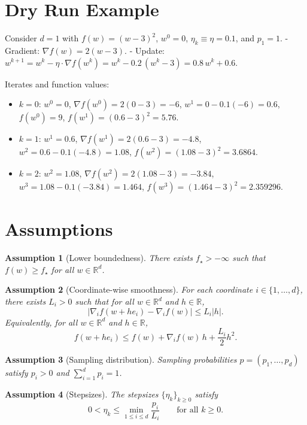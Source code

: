 \documentclass[11pt]{article}
\newtheorem{assumption}{Assumption}
\newcommand{\R}{\mathbb{R}}
\newcommand{\1}{\mathbbm{1}}
\begin{document}
\section*{Dry Run Example}
Consider $d=1$ with $f(w)=(w-3)^2$, $w^0=0$, $\eta_k\equiv \eta=0.1$, and $p_1=1$.
- Gradient: $\nabla f(w)=2(w-3)$.
- Update: $w^{k+1}=w^k-\eta\cdot \nabla f(w^k)=w^k-0.2\,(w^k-3)=0.8\,w^k+0.6$.

Iterates and function values:
\begin{itemize}
\item $k=0$: $w^0=0$, $\nabla f(w^0)=2(0-3)=-6$, $w^1=0-0.1(-6)=0.6$, $f(w^0)=9$, $f(w^1)=(0.6-3)^2=5.76$.
\item $k=1$: $w^1=0.6$, $\nabla f(w^1)=2(0.6-3)=-4.8$, $w^2=0.6-0.1(-4.8)=1.08$, $f(w^2)=(1.08-3)^2=3.6864$.
\item $k=2$: $w^2=1.08$, $\nabla f(w^2)=2(1.08-3)=-3.84$, $w^3=1.08-0.1(-3.84)=1.464$, $f(w^3)=(1.464-3)^2=2.359296$.
\end{itemize}

\section*{Assumptions}
\begin{assumption}[Lower boundedness]
There exists $f_\star>-\infty$ such that $f(w)\ge f_\star$ for all $w\in\R^d$.
\end{assumption}

\begin{assumption}[Coordinate-wise smoothness]
For each coordinate $i\in\{1,\dots,d\}$, there exists $L_i>0$ such that for all $w\in\R^d$ and $h\in\R$,
\[
\left|\nabla_i f\!\left(w+h e_i\right)-\nabla_i f(w)\right| \le L_i |h|.
\]
Equivalently, for all $w\in\R^d$ and $h\in\R$,
\[
f(w+h e_i) \le f(w) + \nabla_i f(w)\,h + \frac{L_i}{2}h^2.
\]
\end{assumption}

\begin{assumption}[Sampling distribution]
Sampling probabilities $p=(p_1,\dots,p_d)$ satisfy $p_i>0$ and $\sum_{i=1}^d p_i=1$.
\end{assumption}

\begin{assumption}[Stepsizes]
The stepsizes $\{\eta_k\}_{k\ge 0}$ satisfy
\[
0<\eta_k \le \min_{1\le i\le d} \frac{p_i}{L_i}\qquad\text{for all }k\ge 0.
\]
\end{assumption}
\end{document}
